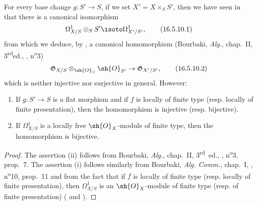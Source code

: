 \begin{env}[16.5.10]
\label{IV.16.5.10}
For every base change $g : S' \to S$, if we set $X' = X \times_S S'$, then we have seen in  that there is a canonical isomorphism
\[
\label{IV.16.5.10.1}
  \Omega_{X/S}^1 \otimes_S S' \isoto \Omega_{X'/S'}^1,
  \tag{16.5.10.1}
\]
from which we deduce, by , a canonical homomorphism (Bourbaki, \emph{Alg.}, chap.~II, 3\textsuperscript{rd}ed., , n\textsuperscript{o}3)
\[
\label{IV.16.5.10.2}
  \mathfrak{G}_{X/S} \otimes_{\sh{O}_S} \sh{O}_{S'} \to \mathfrak{G}_{X'/S'},
  \tag{16.5.10.2}
\]
which is neither injective nor surjective in general.
However:
\end{env}

\begin{proposition}[16.5.11]
\label{IV.16.5.11}
\begin{enumerate}
  \item[{\rm(i)}] If $g : S' \to S$ is a flat morphism and if $f$ is locally of finite type (resp. locally of finite presentation), then the homomorphism  is injective (resp. bijective).
  \item[{\rm(ii)}] If $\Omega_{X/S}^1$ is a locally free $\sh{O}_X$-module of finite type, then the homomorphism  is bijective.
\end{enumerate}
\end{proposition}

\begin{proof}
The assertion (ii) follows from Bourbaki, \emph{Alg.}, chap.~II, 3\textsuperscript{rd}~ed., , n\textsuperscript{o}3, prop.~7.
The assertion (i) follows similarly from Bourbaki, \emph{Alg. Comm.}, chap.~I, , n\textsuperscript{o}10, prop.~11 and from the fact that if $f$ is locally of finite type (resp. locally of finite presentation), then $\Omega_{X/S}^1$ is an $\sh{O}_X$-module of finite type (resp. of finite presentation) ( and ).
\end{proof}

